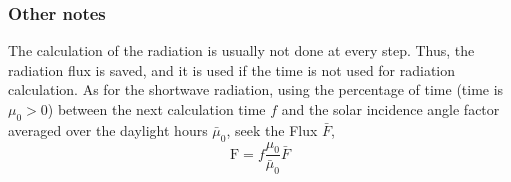 \hypertarget{other-notes}{%
\subsubsection{Other notes}\label{other-notes}}

The calculation of the radiation is usually not done at every step.
Thus, the radiation flux is saved, and it is used if the time is not
used for radiation calculation. As for the shortwave radiation, using
the percentage of time (time is \(\mu_{0}>0\)) between the next
calculation time \(f\) and the solar incidence angle factor averaged
over the daylight hours \(\bar{\mu}_{0}\), seek the Flux \(\bar{F}\), \begin{equation}
\mathrm{F}=f \frac{\mu_{0}}{\bar{\mu}_{0}} \bar{F}
\end{equation}
